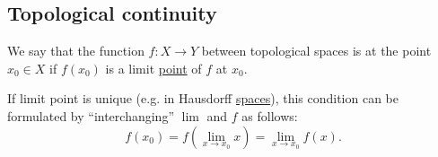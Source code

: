 \subsection{Topological continuity}\label{subsec:topological_continuity}

\begin{definition}\label{def:local_continuity}
  We say that the function \( f: X \to Y \) between topological spaces is  at the point \( x_0 \in X \) if \( f(x_0) \) is a limit \hyperref[def:local_convergence]{point} of \( f \) at \( x_0 \).

  If limit point is unique (e.g. in Hausdorff \hyperref[thm:t2_iff_singleton_limits]{spaces}), this condition can be formulated by \enquote{interchanging} \( \lim \) and \( f \) as follows:
  \begin{equation*}
    f(x_0) = f\left( \lim_{x \to x_0} x \right) = \lim_{x \to x_0} f(x).
  \end{equation*}
\end{definition}


